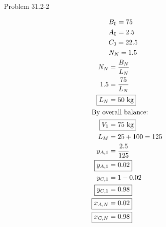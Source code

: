 \item Problem 31.2-2

\begin{align*}
    & B_0 = 75 \\
    & A_0 = 2.5 \\
    & C_0 = 22.5 \\
    & N_N = 1.5 \\
    N_N &= \frac{B_N}{L_N} \\
    1.5 &= \frac{75}{L_N} \\
    \Aboxed{L_N &= 50 \text{ kg}} \\
    \intertext{By overall balance:}
    \Aboxed{V_1 &= 75 \text{ kg}} \\
    L_M &= 25 + 100 = 125 \\
    y_{A,1} &= \frac{2.5}{125} \\
    \Aboxed{y_{A,1} &= 0.02} \\
    y_{C,1} &= 1 - 0.02 \\
    \Aboxed{y_{C,1} &= 0.98} \\
    \Aboxed{x_{A,N} &= 0.02} \\
    \Aboxed{x_{C,N} &= 0.98}
\end{align*}